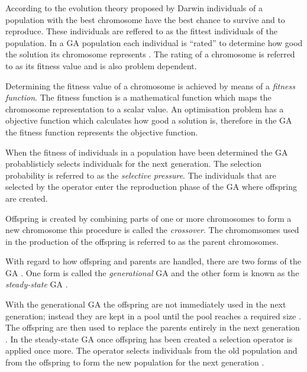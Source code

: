 According to the evolution theory proposed by Darwin individuals of a population with the best chromosome have the best chance to survive and to reproduce\cite{CompuIntelligenceIntro}. These individuals are reffered to as the fittest individuals of the population. In a \gls{GA} population each individual is ``rated'' to determine how good the solution its chromosome represents \cite{CompuIntelligenceIntro}. The rating of a chromosome is referred to as its fitness value and is also problem dependent\cite{CompuIntelligenceIntro}.

Determining the fitness value of a chromosome is achieved by means of a \emph{fitness function}. The fitness function is a mathematical function which maps the chromosome representation to a scalar value\cite{CompuIntelligenceIntro}. An optimisation problem has a objective function which calculates how good a solution is, therefore in the \gls{GA} the fitness function represents the objective function\cite{CompuIntelligenceIntro}.

When the fitness of individuals in a population have been determined the \gls{GA} probablisticly selects individuals for the next generation\cite{CompuIntelligenceIntro}. The selection probability is referred to as the \emph{selective pressure}\cite{CompuIntelligenceIntro}. The individuals that are selected by the operator enter the reproduction phase of the \gls{GA} where offspring are created\cite{CompuIntelligenceIntro}.

Offspring is created by combining parts of one or more chromosomes to form a new chromosome this procedure is called the \emph{crossover}\cite{CompuIntelligenceIntro}. The chromomsomes used in the production of the offspring is referred to as the parent chromosomes\cite{CompuIntelligenceIntro}.

With regard to how offspring and parents are handled, there are two forms of the \gls{GA} \cite{FamilyGA}. One form is called the \emph{generational} \gls{GA}  and the other form is known as the \emph{steady-state} \gls{GA} \cite{GeostatisticalGA,FamilyGA}.

With the generational \gls{GA} the offspring are not immediately used in the next generation; instead they are kept in a pool until the pool reaches a required size \cite{FamilyGA}. The offspring are then used to replace the parents entirely in the next generation \cite{FamilyGA}. In the steady-state \gls{GA} once offspring has been created a selection operator is applied once more. The operator selects individuals from the old population and from the offspring to form the new population for the next generation \cite{GeostatisticalGA,FamilyGA}.

